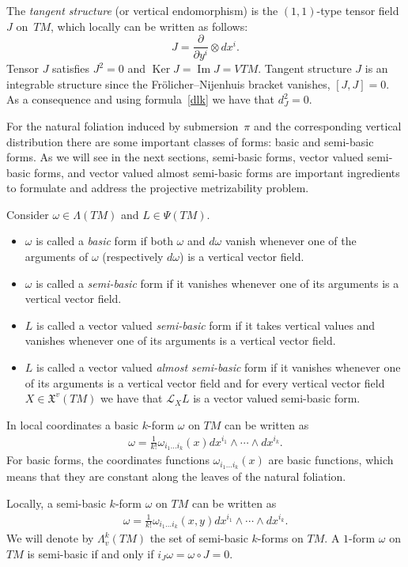 \documentclass[pdftex]{sigma}
\numberwithin{equation}{section}
\begin{document}
The \emph{tangent structure} (or vertical endomorphism) is the
$(1,1)$-type tensor f\/ield $J$ on~$TM$, which locally can be
written as follows:
\[
J=\frac{\partial}{\partial y^i} \otimes dx^i.
\]
Tensor $J$ satisf\/ies $J^2=0$ and $\operatorname{Ker} J=
\operatorname{Im} J=VTM$. Tangent structure $J$ is an integrable structure
since the Fr\"olicher--Nijenhuis bracket vanishes, $[J,J]=0$. As a consequence and using formula~\eqref{dlk} we have that
$d_J^2=0$.

For the natural foliation induced by submersion~$\pi$ and the
corresponding vertical distribution there are some important classes
of forms: basic and semi-basic forms. As we will see in the next
sections, semi-basic forms, vector valued semi-basic forms, and vector valued almost
semi-basic forms are important ingredients to formulate and
address the projective metrizability problem.
\begin{Definition} Consider $\omega\in \Lambda(TM)$ and $L\in \Psi(TM)$.
\begin{itemize}\itemsep=0pt
\item[i)] $\omega$ is called a \emph{basic} form if both $\omega$ and
  $d\omega$ vanish whenever one of the arguments of $\omega$
  (respectively $d\omega$) is a vertical vector f\/ield.
\item[ii)] $\omega$ is called a \emph{semi-basic} form if it vanishes whenever
one of its arguments is a vertical vector f\/ield.
\item[iii)] $L$ is called a vector valued \emph{semi-basic} form if it takes vertical values and vanishes
whenever one of its arguments is a vertical vector f\/ield.
\item[iv)] $L$ is called a vector valued \emph{almost semi-basic} form
  if it vanishes whenever one of its arguments is a vertical vector f\/ield
and for every vertical vector f\/ield $X\in {\mathfrak X}^v(TM)$ we
have that $\mathcal{L}_XL$ is a vector valued semi-basic form.
\end{itemize}
\end{Definition}
In local coordinates a basic $k$-form $\omega$ on $TM$ can
be written as
\begin{gather*}
 \omega=\frac{1}{k!}\omega_{i_1\dots i_k}(x)dx^{i_1}\wedge \cdots
\wedge dx^{i_k}.%
\end{gather*}
For basic forms, the coordinates functions $\omega_{i_1\dots i_k}(x)$ are basic
functions, which means that they are constant along the leaves of the
natural foliation.

Locally, a semi-basic $k$-form $\omega$ on $TM$ can
be written as
\begin{gather}
 \omega=\frac{1}{k!}\omega_{i_1\dots i_k}(x,y)dx^{i_1}\wedge \cdots
\wedge dx^{i_k}.\label{eq:smf}
\end{gather}
We will denote by $\Lambda^k_v(TM)$ the set of
semi-basic $k$-forms on $TM$. A $1$-form $\omega$ on $TM$ is
semi-basic if and only if $i_J\omega=\omega \circ J=0$.
\end{document}
